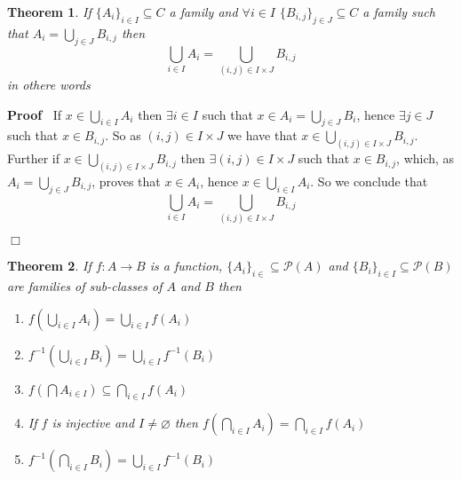\documentclass{book}
\newenvironment{proof}{\noindent\textbf{Proof\ }}{\hspace*{\fill}$\Box$\medskip}
\newtheorem{theorem}{Theorem}
\begin{document}
\begin{theorem}
  \label{family union of family of families}If $\{ A_i \}_{i \in I} \subseteq
  C$ a family and $\forall i \in I$ $\{ B_{i, j} \}_{j \in J} \subseteq C$ a
  family such that $A_i = \bigcup_{j \in J} B_{i, j}$ then
  \[ \bigcup_{i \in I} A_i = \bigcup_{(i, j) \in I \times J} B_{i, j} \]
  in othere words 
\end{theorem}

\begin{proof}
  If $x \in \bigcup_{i \in I} A_i$ then $\exists i \in I$ such that $x \in A_i
  = \bigcup_{j \in J} B_i$, hence $\exists j \in J$ such that $x \in B_{i,
  j}$. So as $(i, j) \in I \times J$ we have that $x \in \bigcup_{(i, j) \in I
  \times J} B_{i, j}$. Further if $x \in \bigcup_{(i, j) \in I \times J} B_{i,
  j}$ then $\exists (i, j) \in I \times J$ such that $x \in B_{i, j}$, which,
  as $A_i = \bigcup_{j \in J} B_{i, j}$, proves that $x \in A_i$, hence $x \in
  \bigcup_{i \in I} A_i$. So we conclude that
  \[ \bigcup_{i \in I} A_i = \bigcup_{(i, j) \in I \times J} B_{i, j} \]
  
\end{proof}

\begin{theorem}
  \label{family image and preimage}If $f : A \rightarrow B$ is a function, $\{
  A_i \}_{i \in} \subseteq \mathcal{P} (A)$ and $\{ B_i \}_{i \in I} \subseteq
  \mathcal{P} (B)$ are families of sub-classes of $A$ and $B$ then
  \begin{enumerate}
    \item $f \left( \bigcup_{i \in I} A_i \right) = \bigcup_{i \in I} f (A_i)$
    
    \item $f^{- 1} \left( \bigcup_{i \in I} B_i \right) = \bigcup_{i \in I}
    f^{- 1} (B_i)$
    
    \item $f \left( \bigcap A_{i \in I} \right) \subseteq \bigcap_{i \in I} f
    (A_i)$
    
    \item If $f$ is injective and $I \neq \varnothing$ then $f \left(
    \bigcap_{i \in I} A_i \right) = \bigcap_{i \in I} f (A_i)$
    
    \item $f^{- 1} \left( \bigcap_{i \in I} B_i \right) = \bigcup_{i \in I}
    f^{- 1} (B_i)$
  \end{enumerate}
\end{theorem}
\end{document}
